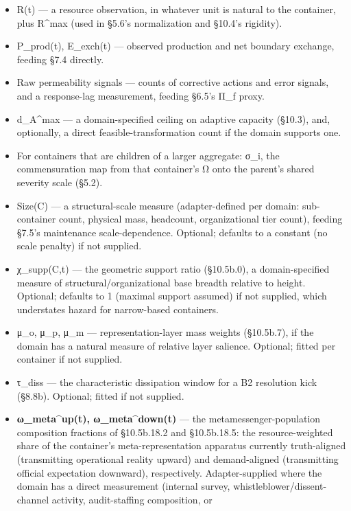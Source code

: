 \documentclass[
]{article}
\begin{document}
\begin{itemize}
\item
  R(t) --- a resource observation, in whatever unit is natural to the
  container, plus R\^{}max (used in §5.6's normalization and §10.4's
  rigidity).
\item
  P\_prod(t), E\_exch(t) --- observed production and net boundary
  exchange, feeding §7.4 directly.
\item
  Raw permeability signals --- counts of corrective actions and error
  signals, and a response-lag measurement, feeding §6.5's Π\_f proxy.
\item
  d\_A\^{}max --- a domain-specified ceiling on adaptive capacity
  (§10.3), and, optionally, a direct feasible-transformation count if
  the domain supports one.
\item
  For containers that are children of a larger aggregate: σ\_i, the
  commensuration map from that container's Ω onto the parent's shared
  severity scale (§5.2).
\item
  Size(C) --- a structural-scale measure (adapter-defined per domain:
  sub-container count, physical mass, headcount, organizational tier
  count), feeding §7.5's maintenance scale-dependence. Optional;
  defaults to a constant (no scale penalty) if not supplied.
\item
  χ\_supp(C,t) --- the geometric support ratio (§10.5b.0), a
  domain-specified measure of structural/organizational base breadth
  relative to height. Optional; defaults to 1 (maximal support assumed)
  if not supplied, which understates hazard for narrow-based containers.
\item
  μ\_o, μ\_p, μ\_m --- representation-layer mass weights (§10.5b.7), if
  the domain has a natural measure of relative layer salience. Optional;
  fitted per container if not supplied.
\item
  τ\_diss --- the characteristic dissipation window for a B2 resolution
  kick (§8.8b). Optional; fitted if not supplied.
\item
  \textbf{ω\_meta\^{}up(t), ω\_meta\^{}down(t)} --- the
  metamessenger-population composition fractions of §10.5b.18.2 and
  §10.5b.18.5: the resource-weighted share of the container's
  meta-representation apparatus currently truth-aligned (transmitting
  operational reality upward) and demand-aligned (transmitting official
  expectation downward), respectively. Adapter-supplied where the domain
  has a direct measurement (internal survey,
  whistleblower/dissent-channel activity, audit-staffing composition, or

\end{itemize}
\end{document}
